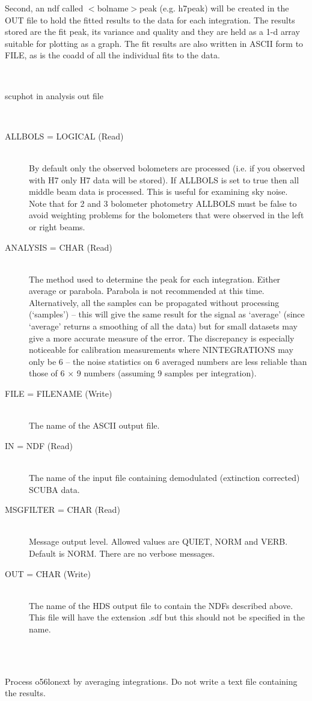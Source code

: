 \documentclass[twoside,11pt]{article}
\renewcommand{\_}{\texttt{\symbol{95}}}
\newlength{\sstexampleslength}
\newcommand{\sstusage}[1]{\item[Usage:] \mbox{}
\\[1.3ex]{\raggedright \ssttt #1}}
\newcommand{\sstparameters}[1]{
   \item[Parameters:] \mbox{} \\
   \vspace{-3.5ex}
   \begin{description}
      #1
   \end{description}
}
\newcommand{\sstexamples}[1]{
   \item[Examples:] \mbox{} \\
   \vspace{-3.5ex}
   \begin{description}
      #1
   \end{description}
}
\newcommand{\sstsubsection}[1]{ \item[{#1}] \mbox{} \\}
\newcommand{\sstexamplesubsection}[2]{\sloppy
\item[\parbox{\sstexampleslength}{\ssttt #1}] \mbox{} \vspace{1.0ex}
\\ #2 }
\newcommand{\sstnotes}[1]{\item[Notes:] \mbox{} \\[1.3ex] #1}
\newcommand{\sstitemlist}[1]{
  \mbox{} \\
  \vspace{-3.5ex}
  \begin{itemize}
     #1
  \end{itemize}
}
\newcommand{\sstitem}{\item}
\newcommand{\sstusage}[1]{\item[Usage:]
      \begin{description}
         {\ssttt #1}
      \end{description}
      \\
   }
\newcommand{\sstparameters}[1]{
      \item[Parameters:] \\
      \begin{description}
         #1
      \end{description}
      \\
   }
\newcommand{\sstexamples}[1]{
      \item[Examples:] \\
      \begin{description}
         #1
      \end{description}
      \\
   }
\newcommand{\sstsubsection}[1]{\item[{#1}]}
\newcommand{\sstexamplesubsection}[2]{\item[{\ssttt #1}] #2}
\newcommand{\sstnotes}[1]{\item[Notes:] #1 }
\newcommand{\sstitemlist}[1]{
      \begin{itemize}
         #1
      \end{itemize}
      \\
   }
\newcommand{\sstitem}{\item}
\begin{document}
{{{         \sstitem
          Second, an ndf called $<$bolname$>$\_peak (e.g. h7\_peak) will be created
            in the OUT file to hold the fitted results to the data for each
            integration. The results stored are the fit peak, its variance and
            quality and they are held as a 1-d array suitable for plotting as
            a graph. The fit results are also written in ASCII form to FILE, as
            is the coadd of all the individual fits to the data.
      }
   }
   \sstusage{
      scuphot in analysis out file
   }
   \sstparameters{
      \sstsubsection{
         ALLBOLS = LOGICAL (Read)
      }{
         By default only the observed bolometers are processed (i.e. if you
         observed with H7 only H7 data will be stored). If ALLBOLS is set
         to true then all middle beam data is processed. This is useful
         for examining sky noise. Note that for 2 and 3 bolometer photometry
         ALLBOLS must be false to avoid weighting problems for the
         bolometers that were observed in the left or right beams.
      }
      \sstsubsection{
         ANALYSIS = CHAR (Read)
      }{
         The method used to determine the peak for each integration.  
         Either average or parabola.
         Parabola is not recommended at this time. Alternatively, all the
         samples can be propagated without processing (`samples') -- 
         this will give the same result for the signal as `average' 
         (since `average' returns a smoothing of all the data) 
         but for small datasets may give a more accurate measure of the error.
         The discrepancy is especially noticeable for calibration measurements
         where N\_INTEGRATIONS may only be 6 -- the noise statistics on 6 
         averaged numbers are less reliable than those of 6 $\times$ 9 numbers
         (assuming 9 samples per integration).
      }
      \sstsubsection{
         FILE = FILENAME (Write)
      }{
         The name of the ASCII output file.
      }
      \sstsubsection{
         IN = NDF (Read)
      }{
         The name of the input file containing demodulated (extinction
         corrected) SCUBA data.
      }
      \sstsubsection{
         MSG\_FILTER = CHAR (Read)
      }{
         Message output level. Allowed values are QUIET, NORM and VERB.
         Default is NORM. There are no verbose messages.
      }
      \sstsubsection{
         OUT = CHAR (Write)
      }{
         The name of the HDS output file to contain the NDFs described above.
         This file will have the extension .sdf but this should not be
         specified in the name.
      }
   }
   \sstexamples{
      \sstexamplesubsection{
         scuphot o56\_lon\_ext average o56\_lon\_pht !
      }{
        Process o56\_lon\_ext by averaging integrations. Do not write
        a text file containing the results.
      }
   }
   \sstnotes{
      \sstitemlist{

}}}
\end{document}
